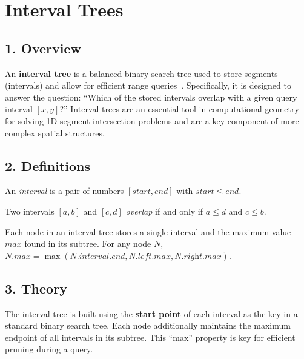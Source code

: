 \section{Interval Trees}
\label{sec:interval_tree}

\subsection{1. Overview}
An \textbf{interval tree} is a balanced binary search tree used to store segments (intervals) and allow for efficient range queries~\cite{edelsbrunner1980}. Specifically, it is designed to answer the question: ``Which of the stored intervals overlap with a given query interval $[x, y]$?'' Interval trees are an essential tool in computational geometry for solving 1D segment intersection problems and are a key component of more complex spatial structures.

\subsection{2. Definitions}
\begin{definition}[Interval]
\label{def:it_interval}
An \emph{interval} is a pair of numbers $[start, end]$ with $start \le end$.
\end{definition}

\begin{definition}
\label{def:it_overlap}
Two intervals $[a, b]$ and $[c, d]$ \emph{overlap} if and only if $a \le d$ and $c \le b$.
\end{definition}

\begin{definition}
\label{def:it_node}
Each node in an interval tree stores a single interval and the maximum value $\textit{max}$ found in its subtree. For any node $N$, $N.\textit{max} = \max(N.\textit{interval}.\textit{end}, N.\textit{left}.\textit{max}, N.\textit{right}.\textit{max})$.
\end{definition}

\subsection{3. Theory}
The interval tree is built using the \textbf{start point} of each interval as the key in a standard binary search tree. Each node additionally maintains the maximum endpoint of all intervals in its subtree. This ``max'' property is key for efficient pruning during a query.


